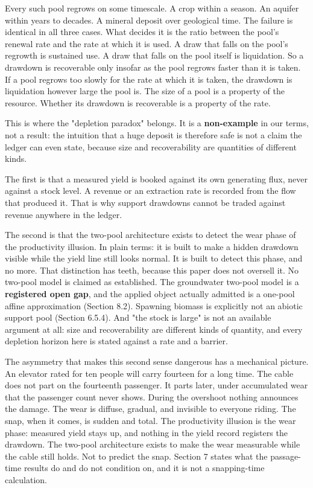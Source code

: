 \documentclass[11pt]{article}
\begin{document}
Every such pool regrows on some timescale. A crop within a season. An aquifer within years to decades. A mineral deposit over geological time. The failure is identical in all three cases. What decides it is the ratio between the pool's renewal rate and the rate at which it is used. A draw that falls on the pool's regrowth is sustained use. A draw that falls on the pool itself is liquidation. So a drawdown is recoverable only insofar as the pool regrows faster than it is taken. If a pool regrows too slowly for the rate at which it is taken, the drawdown is liquidation however large the pool is. The size of a pool is a property of the resource. Whether its drawdown is recoverable is a property of the rate.

This is where the "depletion paradox" belongs. It is a \textbf{non-example} in our terms, not a result: the intuition that a huge deposit is therefore safe is not a claim the ledger can even state, because size and recoverability are quantities of different kinds.

The first is that a measured yield is booked against its own generating flux, never against a stock level. A revenue or an extraction rate is recorded from the flow that produced it. That is why support drawdowns cannot be traded against revenue anywhere in the ledger.

The second is that the two-pool architecture exists to detect the wear phase of the productivity illusion. In plain terms: it is built to make a hidden drawdown visible while the yield line still looks normal. It is built to detect this phase, and no more. That distinction has teeth, because this paper does not oversell it. No two-pool model is claimed as established. The groundwater two-pool model is a \textbf{registered open gap}, and the applied object actually admitted is a one-pool affine approximation (Section 8.2). Spawning biomass is explicitly not an abiotic support pool (Section 6.5.4). And "the stock is large" is not an available argument at all: size and recoverability are different kinds of quantity, and every depletion horizon here is stated against a rate and a barrier.

The asymmetry that makes this second sense dangerous has a mechanical picture. An elevator rated for ten people will carry fourteen for a long time. The cable does not part on the fourteenth passenger. It parts later, under accumulated wear that the passenger count never shows. During the overshoot nothing announces the damage. The wear is diffuse, gradual, and invisible to everyone riding. The snap, when it comes, is sudden and total. The productivity illusion is the wear phase: measured yield stays up, and nothing in the yield record registers the drawdown. The two-pool architecture exists to make the wear measurable while the cable still holds. Not to predict the snap. Section 7 states what the passage-time results do and do not condition on, and it is not a snapping-time calculation.
\end{document}
